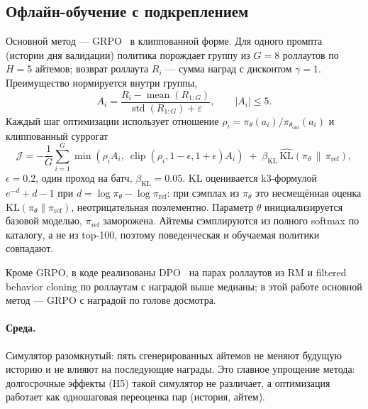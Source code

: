 \subsection{Офлайн-обучение с подкреплением}

Основной метод --- GRPO~\cite{grpo} в клиппованной форме. Для одного промпта
(истории дня валидации) политика порождает группу из $G=8$ роллаутов по
$H=5$ айтемов; возврат роллаута $R_i$ --- сумма наград с дисконтом
$\gamma=1$. Преимущество нормируется внутри группы,
\begin{equation}
A_i = \frac{R_i - \operatorname{mean}(R_{1:G})}{\operatorname{std}(R_{1:G}) + \varepsilon},
\qquad |A_i| \le 5.
\end{equation}
Каждый шаг оптимизации использует отношение
$\rho_i = \pi_\theta(a_i)/\pi_{\theta_{\text{old}}}(a_i)$ и клиппованный
суррогат
\begin{equation}
\mathcal{J} = -\frac{1}{G}\sum_{i=1}^{G}
\min\!\left(\rho_i A_i,\ \operatorname{clip}(\rho_i,1-\epsilon,1+\epsilon)A_i\right)
\;+\; \beta_{\text{KL}}\,\widehat{\mathrm{KL}}\!\left(\pi_\theta \,\|\, \pi_{\text{ref}}\right),
\end{equation}
$\epsilon=0.2$, один проход на батч, $\beta_{\text{KL}}=0.05$. KL оценивается
k3-формулой $e^{-d} + d - 1$ при $d = \log\pi_\theta - \log\pi_{\text{ref}}$:
при сэмплах из $\pi_\theta$ это несмещённая оценка
$\mathrm{KL}(\pi_\theta\|\pi_{\text{ref}})$, неотрицательная поэлементно.
Параметр $\theta$ инициализируется базовой моделью, $\pi_{\text{ref}}$
заморожена. Айтемы сэмплируются из полного softmax по каталогу, а не из
top-100, поэтому поведенческая и обучаемая политики совпадают.

Кроме GRPO, в коде реализованы DPO~\cite{dpo} на парах роллаутов из RM и
filtered behavior cloning по роллаутам с наградой выше медианы; в этой работе
основной метод --- GRPO с наградой по голове досмотра.

\paragraph{Среда.} Симулятор разомкнутый: пять сгенерированных айтемов не
меняют будущую историю и не влияют на последующие награды. Это главное
упрощение метода: долгосрочные эффекты (H5) такой симулятор не различает,
а оптимизация работает как одношаговая переоценка пар (история, айтем).
